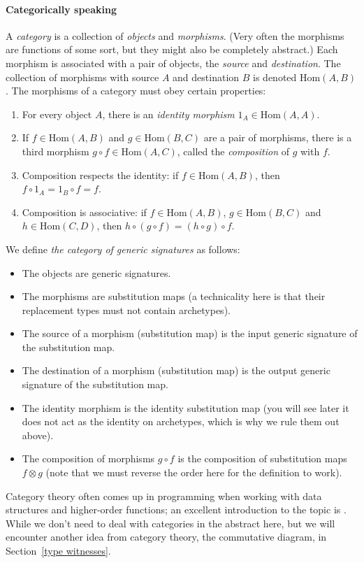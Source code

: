 \documentclass[../generics]{subfiles}
\begin{document}
\paragraph{Categorically speaking}
%
%
%
%
%
A \emph{category} is a collection of \emph{objects} and \emph{morphisms}. (Very often the morphisms are functions of some sort, but they might also be completely abstract.) Each morphism is associated with a pair of objects, the \emph{source} and \emph{destination}. The collection of morphisms with source $A$ and destination $B$ is denoted $\mathrm{Hom}(A,B)$. The morphisms of a category must obey certain properties:
\begin{enumerate}
\item For every object $A$, there is an \emph{identity morphism} $1_A\in\mathrm{Hom}(A, A)$.
\item If $f\in\mathrm{Hom}(A, B)$ and $g\in\mathrm{Hom}(B, C)$ are a pair of morphisms, there is a third morphism $g\circ f\in\mathrm{Hom}(A,C)$, called the \emph{composition} of $g$ with $f$.
\item Composition respects the identity: if $f\in\mathrm{Hom}(A, B)$, then $f\circ 1_A=1_B\circ f=f$.
\item Composition is associative: if $f\in\mathrm{Hom}(A, B)$, $g\in\mathrm{Hom}(B, C)$ and $h\in\mathrm{Hom}(C, D)$, then $h\circ(g\circ f)=(h\circ g)\circ f$.
\end{enumerate}
We define \emph{the category of generic signatures} as follows:
\begin{itemize}
\item The objects are generic signatures.
\item The morphisms are substitution maps (a technicality here is that their replacement types must not contain archetypes).
\item The source of a morphism (substitution map) is the input generic signature of the substitution map.
\item The destination of a morphism (substitution map) is the output generic signature of the substitution map.
\item The identity morphism is the identity substitution map (you will see later it does not act as the identity on archetypes, which is why we rule them out above).
\item The composition of morphisms $g\circ f$ is the composition of substitution maps $f\otimes g$ (note that we must reverse the order here for the definition to work).
\end{itemize}
Category theory often comes up in programming when working with data structures and higher-order functions; an excellent introduction to the topic is \cite{catprogrammer}. While we don't need to deal with categories in the abstract here, but we will encounter another idea from category theory, the commutative diagram, in Section~\ref{type witnesses}.
\end{document}
